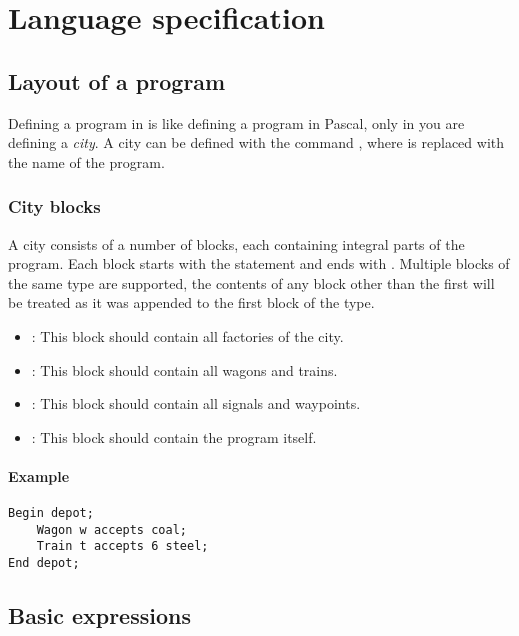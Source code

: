 \chapter{Language specification}

\section{Layout of a program}

Defining a program in \shortname is like defining a program in Pascal, only in \shortname you are defining a \emph{city}. A city can be defined with the command , where  is replaced with the name of the program.

\subsection{City blocks}

A city consists of a number of blocks, each containing integral parts of the program. Each block starts with the statement  and ends with . Multiple blocks of the same type are supported, the contents of any block other than the first will be treated as it was appended to the first block of the type.

\begin{itemize}
\item {}: This block should contain all factories of the city.
\item {}: This block should contain all wagons and trains.
\item {}: This block should contain all signals and waypoints.
\item {}: This block should contain the program itself.
\end{itemize}

\subsubsection*{Example}

\begin{lstlisting}
Begin depot;
	Wagon w accepts coal;
	Train t accepts 6 steel;
End depot;
\end{lstlisting}

\section{Basic expressions}

